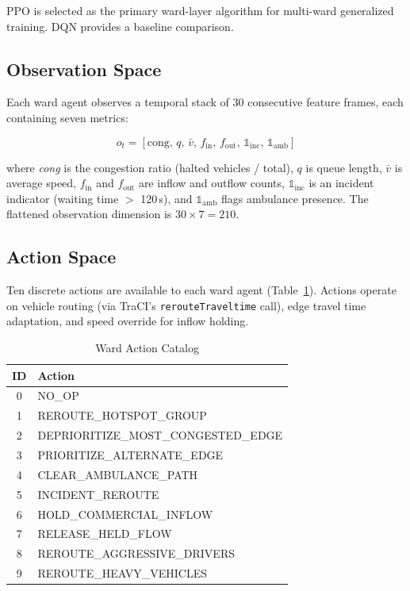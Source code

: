 \documentclass[conference]{IEEEtran}
\begin{document}
PPO is selected as the primary ward-layer algorithm for multi-ward generalized
training. DQN provides a baseline comparison.

\subsection{Observation Space}

Each ward agent observes a temporal stack of 30 consecutive feature frames,
each containing seven metrics:

\begin{equation}
o_t = \left[\text{cong},\, q,\, \bar{v},\, f_{\text{in}},\, f_{\text{out}},\,
\mathbb{1}_{\text{inc}},\, \mathbb{1}_{\text{amb}} \right]
\label{eq:obs}
\end{equation}

where \textit{cong} is the congestion ratio (halted vehicles / total),
$q$ is queue length, $\bar{v}$ is average speed, $f_{\text{in}}$ and
$f_{\text{out}}$ are inflow and outflow counts, $\mathbb{1}_{\text{inc}}$
is an incident indicator (waiting time $>$ 120\,s), and $\mathbb{1}_{\text{amb}}$
flags ambulance presence. The flattened observation dimension is
$30 \times 7 = 210$.

\subsection{Action Space}

Ten discrete actions are available to each ward agent
(Table~\ref{tab:actions}). Actions operate on vehicle routing (via
TraCI's \texttt{rerouteTraveltime} call), edge travel time adaptation,
and speed override for inflow holding.

\begin{table}[!t]
\caption{Ward Action Catalog}
\label{tab:actions}
\centering
\renewcommand{\arraystretch}{1.2}
\begin{tabular}{cl}
\toprule
\textbf{ID} & \textbf{Action} \\
\midrule
0 & NO\_OP \\
1 & REROUTE\_HOTSPOT\_GROUP \\
2 & DEPRIORITIZE\_MOST\_CONGESTED\_EDGE \\
3 & PRIORITIZE\_ALTERNATE\_EDGE \\
4 & CLEAR\_AMBULANCE\_PATH \\
5 & INCIDENT\_REROUTE \\
6 & HOLD\_COMMERCIAL\_INFLOW \\
7 & RELEASE\_HELD\_FLOW \\
8 & REROUTE\_AGGRESSIVE\_DRIVERS \\
9 & REROUTE\_HEAVY\_VEHICLES \\
\bottomrule
\end{tabular}
\end{table}
\end{document}
